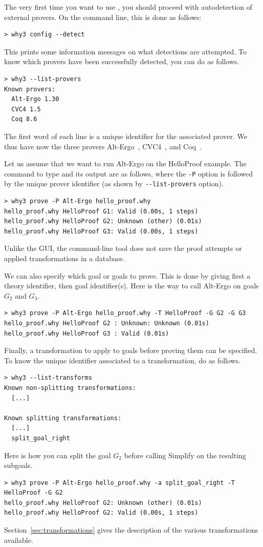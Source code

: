 The very first time you want to use \why, you should proceed with
autodetection of external provers.
On the command line, this is done as follows:
\begin{verbatim}
> why3 config --detect
\end{verbatim}
This prints some information messages on what detections are attempted. To know which
provers have been successfully detected, you can do as follows.
\begin{verbatim}
> why3 --list-provers
Known provers:
  Alt-Ergo 1.30
  CVC4 1.5
  Coq 8.6
\end{verbatim}
The first word of each line
is a unique identifier for the associated prover. We thus have now the
three provers Alt-Ergo~\cite{ergo}, CVC4~\cite{barrett11cade}, and
Coq~\cite{CoqArt}.

Let us assume that we want to run Alt-Ergo on the HelloProof
example. The command to type and its output are as follows, where the
\verb|-P| option is followed by the unique prover identifier (as shown
by \verb|--list-provers| option).
\begin{verbatim}
> why3 prove -P Alt-Ergo hello_proof.why
hello_proof.why HelloProof G1: Valid (0.00s, 1 steps)
hello_proof.why HelloProof G2: Unknown (other) (0.01s)
hello_proof.why HelloProof G3: Valid (0.00s, 1 steps)
\end{verbatim}
Unlike the \why GUI, the command-line tool does not save the proof attempts
or applied transformations in a database.

We can also specify which goal or goals to prove. This is done by giving
first a theory identifier, then goal identifier(s). Here is the way to
call Alt-Ergo on goals $G_2$ and $G_3$.
\begin{verbatim}
> why3 prove -P Alt-Ergo hello_proof.why -T HelloProof -G G2 -G G3
hello_proof.why HelloProof G2 : Unknown: Unknown (0.01s)
hello_proof.why HelloProof G3 : Valid (0.01s)
\end{verbatim}

Finally, a transformation to apply to goals before proving them can be
specified. To know the unique identifier associated to
a transformation, do as follows.
\begin{verbatim}
> why3 --list-transforms
Known non-splitting transformations:
  [...]

Known splitting transformations:
  [...]
  split_goal_right
\end{verbatim}
Here is how you can split the goal $G_2$ before calling
Simplify on the resulting subgoals.
\begin{verbatim}
> why3 prove -P Alt-Ergo hello_proof.why -a split_goal_right -T HelloProof -G G2
hello_proof.why HelloProof G2: Unknown (other) (0.01s)
hello_proof.why HelloProof G2: Valid (0.00s, 1 steps)
\end{verbatim}
Section~\ref{sec:transformations} gives the description of the various
transformations available.


